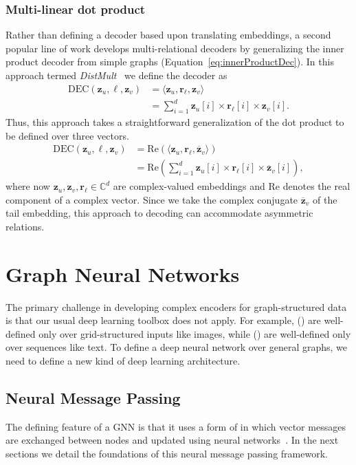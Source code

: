 \subsubsection{Multi-linear dot product}
Rather than defining a decoder based upon translating embeddings, a second popular line of work develops multi-relational decoders by generalizing the inner product decoder from simple graphs (Equation~\ref{eq:innerProductDec}). In this approach termed \textit{DistMult}~\cite{Yang2014DistMult} we define the decoder as
\begin{align*}
    \text{DEC}(\mathbf{z}_u, \ell, \mathbf{z}_v) &= \langle\mathbf{z}_u, \mathbf{r}_\ell, \mathbf{z}_v\rangle\\
    &= \sum_{i=1}^d \mathbf{z}_u[i] \times \mathbf{r}_\ell[i] \times \mathbf{z}_v[i].
\end{align*}
Thus, this approach takes a straightforward generalization of the dot product to be defined over three vectors.
\begin{align*}
\text{DEC}(\mathbf{z}_u, \ell, \mathbf{z}_v) &= \text{Re}(\langle \mathbf{z}_u, \mathbf{r}_\ell, \overline{\mathbf{z}}_v\rangle)\\
&= \text{Re}(\sum_{i=1}^d \mathbf{z}_u[i] \times \mathbf{r}_\ell[i] \times \overline{\mathbf{z}}_v[i]),
\end{align*}
where now $\mathbf{z}_u, \mathbf{z}_v, \mathbf{r}_\ell \in \mathbb{C}^d$ are complex-valued embeddings and $\text{Re}$ denotes the real component of a complex vector. Since we take the complex conjugate $\overline{\mathbf{z}}_v$ of the tail embedding, this approach to decoding can accommodate asymmetric relations.

\section{Graph Neural Networks}\label{sec:gnn}
The primary challenge in developing complex encoders for graph-structured data is that our usual deep learning toolbox does not apply. For example,  () are well-defined only over grid-structured inputs like images, while  () are well-defined only over sequences like text. To define a deep neural network over general graphs, we need to define a new kind of deep learning architecture.

\subsection{Neural Message Passing}
The defining feature of a GNN is that it uses a form of  in which vector messages are exchanged between nodes and updated using neural networks~\cite{Gilmer2017neuralMessagePassing}. In the next sections we detail the foundations of this neural message passing framework.

